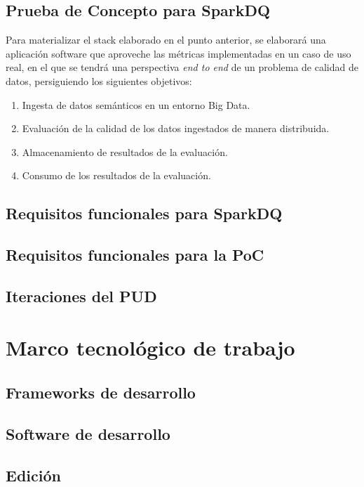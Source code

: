 \subsection{Prueba de Concepto para SparkDQ}

Para materializar el stack elaborado en el punto anterior, se elaborará una
aplicación software que aproveche las métricas implementadas en un caso de uso
real, en el que se tendrá una perspectiva \textit{end to end} de un problema de
calidad de datos, persiguiendo los siguientes objetivos:

\begin{enumerate}
\item Ingesta de datos semánticos en un entorno Big Data.
\item Evaluación de la calidad de los datos ingestados de manera distribuida. 
\item Almacenamiento de resultados de la evaluación.
\item Consumo de los resultados de la evaluación. 
\end{enumerate}

\subsection{Requisitos funcionales para SparkDQ}
\subsection{Requisitos funcionales para la PoC}
\subsection{Iteraciones del \acs{PUD}}

\section{Marco tecnológico de trabajo}

\subsection{Frameworks de desarrollo}
\subsection{Software de desarrollo}
\subsection{Edición}
